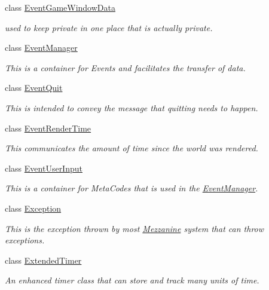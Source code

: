 \begin{DoxyCompactItemize}
class \hyperlink{classMezzanine_1_1EventGameWindowData}{EventGameWindowData}
\begin{DoxyCompactList}\small\item\em used to keep private in one place that is actually private. \item\end{DoxyCompactList}\item 
class \hyperlink{classMezzanine_1_1EventManager}{EventManager}
\begin{DoxyCompactList}\small\item\em This is a container for Events and facilitates the transfer of data. \item\end{DoxyCompactList}\item 
class \hyperlink{classMezzanine_1_1EventQuit}{EventQuit}
\begin{DoxyCompactList}\small\item\em This is intended to convey the message that quitting needs to happen. \item\end{DoxyCompactList}\item 
class \hyperlink{classMezzanine_1_1EventRenderTime}{EventRenderTime}
\begin{DoxyCompactList}\small\item\em This communicates the amount of time since the world was rendered. \item\end{DoxyCompactList}\item 
class \hyperlink{classMezzanine_1_1EventUserInput}{EventUserInput}
\begin{DoxyCompactList}\small\item\em This is a container for MetaCodes that is used in the \hyperlink{classMezzanine_1_1EventManager}{EventManager}. \item\end{DoxyCompactList}\item 
class \hyperlink{classMezzanine_1_1Exception}{Exception}
\begin{DoxyCompactList}\small\item\em This is the exception thrown by most \hyperlink{namespaceMezzanine}{Mezzanine} system that can throw exceptions. \item\end{DoxyCompactList}\item 
class \hyperlink{classMezzanine_1_1ExtendedTimer}{ExtendedTimer}
\begin{DoxyCompactList}\small\item\em An enhanced timer class that can store and track many units of time. \item\end{DoxyCompactList}\item 

\end{DoxyCompactItemize}
